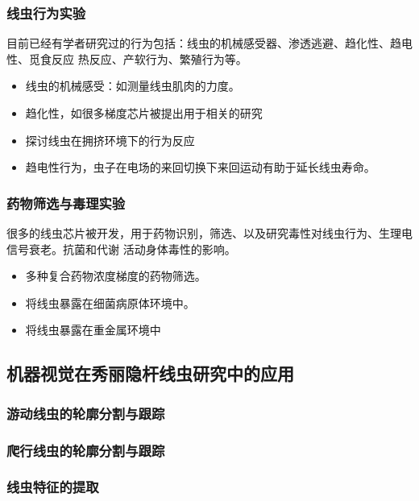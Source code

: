 \subsubsection{线虫行为实验}
\label{sec:intro:analog}
	目前已经有学者研究过的行为包括：线虫的机械感受器、渗透逃避、趋化性、趋电性、觅食反应
热反应、产软行为、繁殖行为等。
	\begin{itemize}
	  \item 线虫的机械感受：如测量线虫肌肉的力度。
	  \item 趋化性，如很多梯度芯片被提出用于相关的研究
	  \item 探讨线虫在拥挤环境下的行为反应
	  \item 趋电性行为，虫子在电场的来回切换下来回运动有助于延长线虫寿命。
	\end{itemize}
\subsubsection{药物筛选与毒理实验}
\label{sec:intro:analog}
	很多的线虫芯片被开发，用于药物识别，筛选、以及研究毒性对线虫行为、生理电信号衰老。抗菌和代谢
活动身体毒性的影响。
	\begin{itemize}
	  \item 多种复合药物浓度梯度的药物筛选。
	  \item 将线虫暴露在细菌病原体环境中。
	  \item 将线虫暴露在重金属环境中
	\end{itemize}

\subsection{机器视觉在秀丽隐杆线虫研究中的应用}
\label{sec:intro:analog}

\subsubsection{游动线虫的轮廓分割与跟踪}
\label{sec:intro:analog}

\subsubsection{爬行线虫的轮廓分割与跟踪}
\label{sec:intro:analog}

\subsubsection{线虫特征的提取}
\label{sec:intro:analog}


